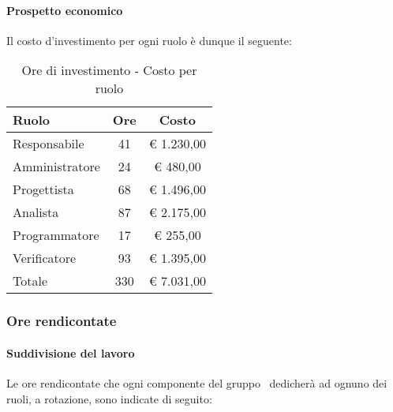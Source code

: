 \documentclass[../PianoProgetto.tex]{subfiles}
\begin{document}
	\paragraph{Prospetto economico}
					Il costo d'investimento per ogni ruolo è dunque il seguente:
					\begin{table}[h]
		\centering
	
		\begin{tabular}{l * {2}{c}}
			\toprule
			Ruolo & Ore & Costo \\
			\midrule
			Responsabile &	41 & \euro{} 1.230,00 \\
			\midrule
			Amministratore & 24 & \euro{} 480,00 \\
			\midrule
			Progettista & 68 & \euro{} 1.496,00 \\
			\midrule
			Analista & 87 & \euro{} 2.175,00 \\
			\midrule
			Programmatore & 17 & \euro{} 255,00 \\
			\midrule
			Verificatore & 93 & \euro{} 1.395,00 \\
			\midrule		
			Totale & 330 & \euro{} 7.031,00 \\
			\bottomrule
			
		\end{tabular}
		
		\caption{Ore di investimento - Costo per ruolo}
		\label{tab:investimento_costo}
		
	\end{table}
	
	\subsubsection{Ore rendicontate}
				\paragraph{Suddivisione del lavoro}
					Le ore rendicontate che ogni componente del gruppo \leaf\ dedicherà ad ognuno dei ruoli, a rotazione, sono indicate di seguito:
	
\end{document}
